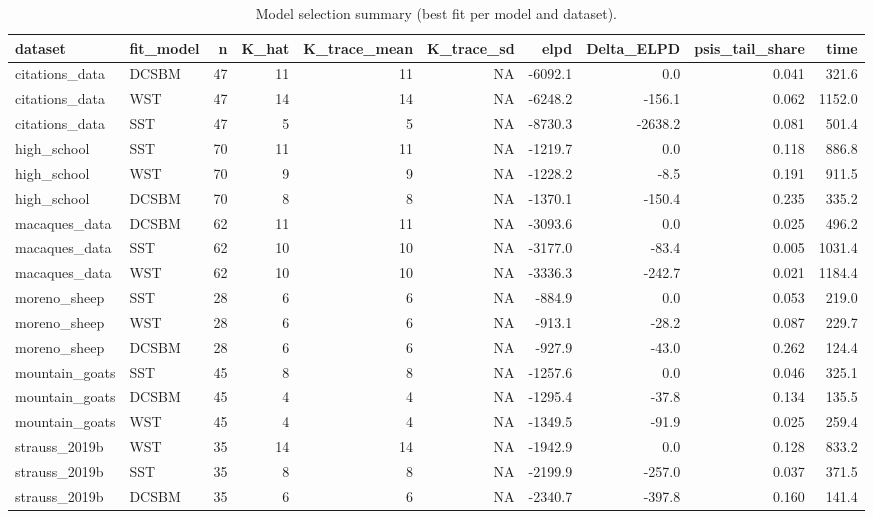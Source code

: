 \begin{table}

\caption{\label{tab:tab:model_selection_overview}Model selection summary (best fit per model and dataset).}
\centering
\begin{tabular}[t]{llrrrrrrrr}
\toprule
dataset & fit\_model & n & K\_hat & K\_trace\_mean & K\_trace\_sd & elpd & Delta\_ELPD & psis\_tail\_share & time\\
\midrule
citations\_data & DCSBM & 47 & 11 & 11 & NA & -6092.1 & 0.0 & 0.041 & 321.6\\
citations\_data & WST & 47 & 14 & 14 & NA & -6248.2 & -156.1 & 0.062 & 1152.0\\
citations\_data & SST & 47 & 5 & 5 & NA & -8730.3 & -2638.2 & 0.081 & 501.4\\
high\_school & SST & 70 & 11 & 11 & NA & -1219.7 & 0.0 & 0.118 & 886.8\\
high\_school & WST & 70 & 9 & 9 & NA & -1228.2 & -8.5 & 0.191 & 911.5\\
\addlinespace
high\_school & DCSBM & 70 & 8 & 8 & NA & -1370.1 & -150.4 & 0.235 & 335.2\\
macaques\_data & DCSBM & 62 & 11 & 11 & NA & -3093.6 & 0.0 & 0.025 & 496.2\\
macaques\_data & SST & 62 & 10 & 10 & NA & -3177.0 & -83.4 & 0.005 & 1031.4\\
macaques\_data & WST & 62 & 10 & 10 & NA & -3336.3 & -242.7 & 0.021 & 1184.4\\
moreno\_sheep & SST & 28 & 6 & 6 & NA & -884.9 & 0.0 & 0.053 & 219.0\\
\addlinespace
moreno\_sheep & WST & 28 & 6 & 6 & NA & -913.1 & -28.2 & 0.087 & 229.7\\
moreno\_sheep & DCSBM & 28 & 6 & 6 & NA & -927.9 & -43.0 & 0.262 & 124.4\\
mountain\_goats & SST & 45 & 8 & 8 & NA & -1257.6 & 0.0 & 0.046 & 325.1\\
mountain\_goats & DCSBM & 45 & 4 & 4 & NA & -1295.4 & -37.8 & 0.134 & 135.5\\
mountain\_goats & WST & 45 & 4 & 4 & NA & -1349.5 & -91.9 & 0.025 & 259.4\\
\addlinespace
strauss\_2019b & WST & 35 & 14 & 14 & NA & -1942.9 & 0.0 & 0.128 & 833.2\\
strauss\_2019b & SST & 35 & 8 & 8 & NA & -2199.9 & -257.0 & 0.037 & 371.5\\
strauss\_2019b & DCSBM & 35 & 6 & 6 & NA & -2340.7 & -397.8 & 0.160 & 141.4\\
\bottomrule
\end{tabular}
\end{table}
